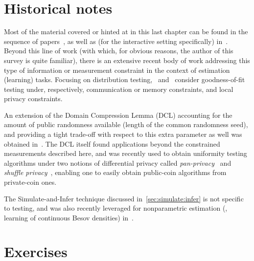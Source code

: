 \section{Historical notes}
  \label{sec:constrained:notes}
Most of the material covered or hinted at in this last chapter can be found in the sequence of papers~\citet{AcharyaCT:IT1,AcharyaCT19b,AcharyaCFST21}, as well as (for the interactive setting specifically) in~\citet{AcharyaCLST21,AcharyaCST20}. Beyond this line of work (with which, for obvious reasons, the author of this survey is quite familiar), there is an extensive recent body of work addressing this type of information or measurement constraint in the context of estimation (learning) tasks. Focusing on distribution testing,~\citet{DiakonikolasGKR19} and~\citet{AminJM20,BerrettB20} consider goodness-of-fit testing under, respectively, communication or memory constraints, and local privacy constraints.

An extension of the Domain Compression Lemma (DCL) accounting for the amount of public randomness available (length of the common randomness seed), and providing a tight trade-off with respect to this extra parameter as well was obtained in~\citet{AcharyaCHST20}. The DCL itself found applications beyond the constrained measurements described here, and was recently used to obtain uniformity testing algorithms under two notions of differential privacy called \emph{pan-privacy}~\citep{AminJM20} and \emph{shuffle privacy}~\citep{BalcerCJM21,CL:22}, enabling one to easily obtain public-coin algorithms from private-coin ones.

The Simulate-and-Infer technique discussed in~\cref{sec:simulate:infer} is not specific to testing, and was also recently leveraged for nonparametric estimation (\ie, learning of continuous Besov densities) in~\citet{ACST:21b}.
\section{Exercises}

